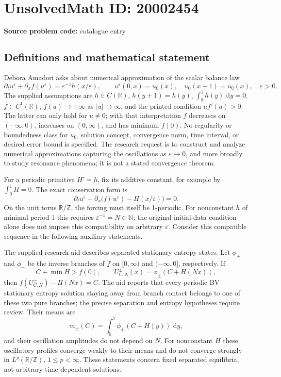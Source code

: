 \documentclass[11pt]{article}
\newcommand{\N}{\mathbb{N}}
\newcommand{\Z}{\mathbb{Z}}
\newcommand{\R}{\mathbb{R}}
\newcommand{\dd}{\,\mathrm{d}}
\begin{document}
\section*{UnsolvedMath ID: 20002454}
\textbf{Source problem code:} catalogue entry
\subsection{Definitions and mathematical statement}
Debora Amadori asks about numerical approximation of the scalar balance law
\[
 \partial_tu^\varepsilon+\partial_x f(u^\varepsilon)
 =\varepsilon^{-1}h(x/\varepsilon),\qquad
 u^\varepsilon(0,x)=u_0(x),\quad u_0(x+1)=u_0(x),\quad\varepsilon>0.
\]
The supplied assumptions are \(h\in C(\R)\), \(h(y+1)=h(y)\), \(\int_0^1h(y)\,\dd y=0\), \(f\in C^1(\R)\), \(f(u)\to+\infty\) as \(|u|\to\infty\), and the printed condition \(uf'(u)>0\). The latter can only hold for \(u\ne0\); with that interpretation \(f\) decreases on \(( -\infty,0)\), increases on \((0,\infty)\), and has minimum \(f(0)\). No regularity or boundedness class for \(u_0\), solution concept, convergence norm, time interval, or desired error bound is specified. The research request is to construct and analyze numerical approximations capturing the oscillations as \(\varepsilon\to0\), and more broadly to study resonance phenomena; it is not a stated convergence theorem.

For a periodic primitive \(H'=h\), fix its additive constant, for example by \(\int_0^1H=0\). The exact conservation form is
\[
 \partial_tu^\varepsilon+\partial_x\bigl(f(u^\varepsilon)-H(x/\varepsilon)\bigr)=0.
\]
On the unit torus \(\R/\Z\), the forcing must itself be 1-periodic. For nonconstant \(h\) of minimal period 1 this requires \(\varepsilon^{-1}=N\in\N\); the original initial-data condition alone does not impose this compatibility on arbitrary \(\varepsilon\). Consider this compatible sequence in the following auxiliary statements.

The supplied research aid describes separated stationary entropy states. Let \(\phi_+\) and \(\phi_-\) be the inverse branches of \(f\) on \([0,\infty)\) and \(( -\infty,0]\), respectively. If
\[
 C+\min H>f(0),\qquad
 U^\pm_{C,N}(x)=\phi_\pm(C+H(Nx)),
\]
then \(f(U^\pm_{C,N})-H(Nx)=C\). The aid reports that every periodic BV stationary entropy solution staying away from branch contact belongs to one of these two pure branches; the precise separation and entropy hypotheses require review. Their means are
\[
 m_\pm(C)=\int_0^1\phi_\pm(C+H(y))\,\dd y,
\]
and their oscillation amplitudes do not depend on \(N\). For nonconstant \(H\) these oscillatory profiles converge weakly to their means and do not converge strongly in \(L^p(\R/\Z)\), \(1\le p<\infty\). These statements concern fixed separated equilibria, not arbitrary time-dependent solutions.
\end{document}
